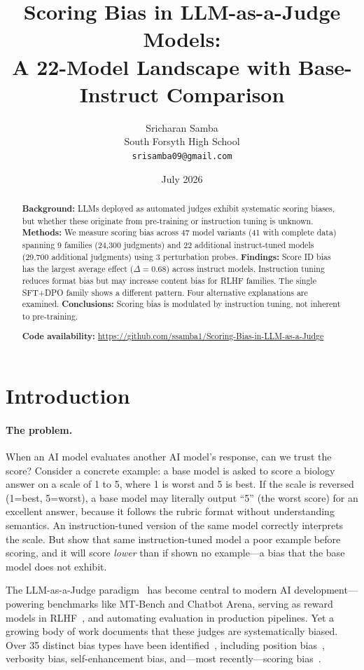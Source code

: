 \documentclass[11pt,twocolumn]{article}
\title{\textbf{Scoring Bias in LLM-as-a-Judge Models:\\
A 22-Model Landscape with Base-Instruct Comparison}}
\author{
  Sricharan Samba\\
  South Forsyth High School\\
  \texttt{srisamba09@gmail.com}
}
\date{July 2026}
\begin{document}
\maketitle

\begin{abstract}
\noindent\textbf{Background:} LLMs deployed as automated judges exhibit systematic scoring biases, but whether these originate from pre-training or instruction tuning is unknown. \textbf{Methods:} We measure scoring bias across 47 model variants (41 with complete data) spanning 9 families (24,300 judgments) and 22 additional instruct-tuned models (29,700 additional judgments) using 3 perturbation probes. \textbf{Findings:} Score ID bias has the largest average effect ($\Delta=0.68$) across instruct models. Instruction tuning reduces format bias but may increase content bias for RLHF families. The single SFT+DPO family shows a different pattern. Four alternative explanations are examined. \textbf{Conclusions:} Scoring bias is modulated by instruction tuning, not inherent to pre-training.

\noindent\textbf{Code availability:} \url{https://github.com/ssamba1/Scoring-Bias-in-LLM-as-a-Judge}
\end{abstract}

\section{Introduction}

\paragraph{The problem.}
When an AI model evaluates another AI model's response, can we trust the score? Consider a concrete example: a base model is asked to score a biology answer on a scale of 1 to 5, where 1 is worst and 5 is best. If the scale is reversed (1=best, 5=worst), a base model may literally output ``5'' (the worst score) for an excellent answer, because it follows the rubric format without understanding semantics. An instruction-tuned version of the same model correctly interprets the scale. But show that same instruction-tuned model a poor example before scoring, and it will score \emph{lower} than if shown no example---a bias that the base model does not exhibit.

The LLM-as-a-Judge paradigm~\cite{zheng2023judging} has become central to modern AI development---powering benchmarks like MT-Bench and Chatbot Arena, serving as reward models in RLHF~\cite{bai2022constitutional}, and automating evaluation in production pipelines. Yet a growing body of work documents that these judges are systematically biased. Over 35 distinct bias types have been identified~\cite{ye2024justice,gu2024survey}, including position bias~\cite{wang2023large}, verbosity bias, self-enhancement bias, and---most recently---scoring bias~\cite{li2025scoring}.
\end{document}
